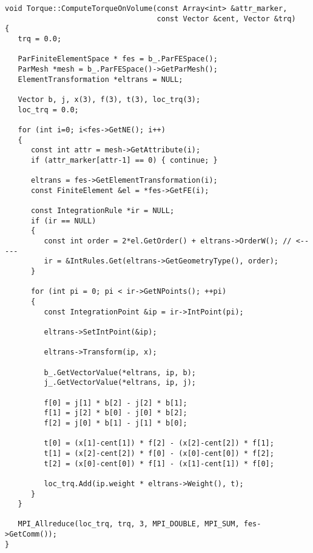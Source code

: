 \documentclass[12pt]{article}
\begin{document}
\begin{verbatim}
void Torque::ComputeTorqueOnVolume(const Array<int> &attr_marker,
                                   const Vector &cent, Vector &trq)
{
   trq = 0.0;

   ParFiniteElementSpace * fes = b_.ParFESpace();
   ParMesh *mesh = b_.ParFESpace()->GetParMesh();
   ElementTransformation *eltrans = NULL;

   Vector b, j, x(3), f(3), t(3), loc_trq(3);
   loc_trq = 0.0;

   for (int i=0; i<fes->GetNE(); i++)
   {
      const int attr = mesh->GetAttribute(i);
      if (attr_marker[attr-1] == 0) { continue; }

      eltrans = fes->GetElementTransformation(i);
      const FiniteElement &el = *fes->GetFE(i);

      const IntegrationRule *ir = NULL;
      if (ir == NULL)
      {
         const int order = 2*el.GetOrder() + eltrans->OrderW(); // <-----
         ir = &IntRules.Get(eltrans->GetGeometryType(), order);
      }

      for (int pi = 0; pi < ir->GetNPoints(); ++pi)
      {
         const IntegrationPoint &ip = ir->IntPoint(pi);

         eltrans->SetIntPoint(&ip);

         eltrans->Transform(ip, x);

         b_.GetVectorValue(*eltrans, ip, b);
         j_.GetVectorValue(*eltrans, ip, j);

         f[0] = j[1] * b[2] - j[2] * b[1];
         f[1] = j[2] * b[0] - j[0] * b[2];
         f[2] = j[0] * b[1] - j[1] * b[0];

         t[0] = (x[1]-cent[1]) * f[2] - (x[2]-cent[2]) * f[1];
         t[1] = (x[2]-cent[2]) * f[0] - (x[0]-cent[0]) * f[2];
         t[2] = (x[0]-cent[0]) * f[1] - (x[1]-cent[1]) * f[0];

         loc_trq.Add(ip.weight * eltrans->Weight(), t);
      }
   }

   MPI_Allreduce(loc_trq, trq, 3, MPI_DOUBLE, MPI_SUM, fes->GetComm());
}
\end{verbatim}
\end{document}
